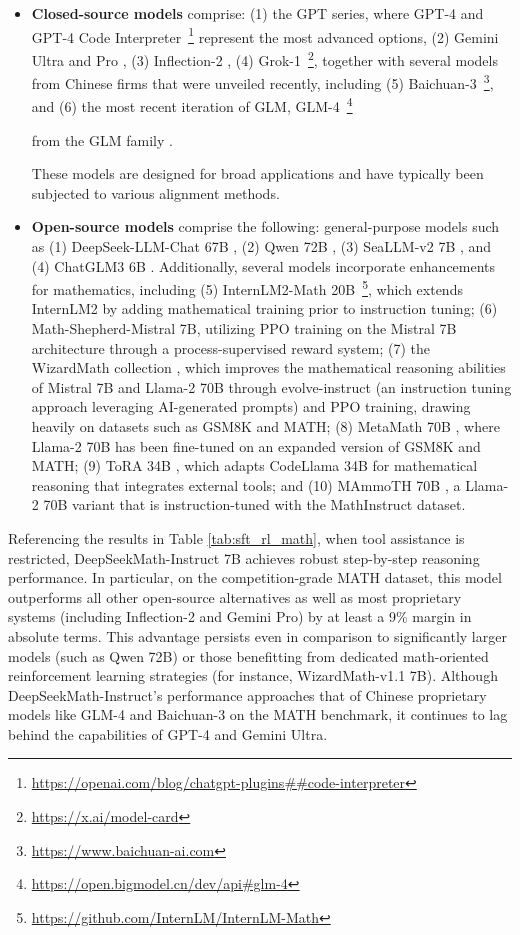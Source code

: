 \begin{itemize}[topsep=0pt]
\begin{itemize}[topsep=0pt]
    \item \textbf{Closed-source models} comprise: (1) the GPT series, where GPT-4 \citep{gpt4} and GPT-4 Code Interpreter~\footnote{\url{https://openai.com/blog/chatgpt-plugins\#\#code-interpreter}} represent the most advanced options, (2) Gemini Ultra and Pro \citep{gemini}, (3) Inflection-2 \citep{inflection-2}, (4) Grok-1~\footnote{\url{https://x.ai/model-card}}, together with several models from Chinese firms that were unveiled recently, including (5) Baichuan-3~\footnote{\url{https://www.baichuan-ai.com}}, and (6) the most recent iteration of GLM, GLM-4~\footnote{\url{https://open.bigmodel.cn/dev/api\#glm-4}}

    from the GLM family \citep{glm}.

These models are designed for broad applications and have typically been subjected to various alignment methods.  
\item \textbf{Open-source models} comprise the following: general-purpose models such as (1) DeepSeek-LLM-Chat 67B \citep{deepseek-llm}, (2) Qwen 72B \citep{qwen}, (3) SeaLLM-v2 7B \citep{seallm}, and (4) ChatGLM3 6B \citep{chatglm3}. Additionally, several models incorporate enhancements for mathematics, including (5) InternLM2-Math 20B~\footnote{\url{https://github.com/InternLM/InternLM-Math}}, which extends InternLM2 by adding mathematical training prior to instruction tuning; (6) Math-Shepherd-Mistral 7B, utilizing PPO training \citep{schulman2017proximal} on the Mistral 7B architecture \citep{mistral} through a process-supervised reward system; (7) the WizardMath collection \citep{wizardmath}, which improves the mathematical reasoning abilities of Mistral 7B and Llama-2 70B \citep{llama2} through evolve-instruct (an instruction tuning approach leveraging AI-generated prompts) and PPO training, drawing heavily on datasets such as GSM8K and MATH; (8) MetaMath 70B \citep{metamath}, where Llama-2 70B has been fine-tuned on an expanded version of GSM8K and MATH; (9) ToRA 34B \cite{tora}, which adapts CodeLlama 34B for mathematical reasoning that integrates external tools; and (10) MAmmoTH 70B \citep{MathInstruct}, a Llama-2 70B variant that is instruction-tuned with the MathInstruct dataset.  
\end{itemize}

Referencing the results in Table \ref{tab:sft_rl_math}, when tool assistance is restricted, DeepSeekMath-Instruct 7B achieves robust step-by-step reasoning performance. In particular, on the competition-grade MATH dataset, this model outperforms all other open-source alternatives as well as most proprietary systems (including Inflection-2 and Gemini Pro) by at least a 9\% margin in absolute terms. This advantage persists even in comparison to significantly larger models (such as Qwen 72B) or those benefitting from dedicated math-oriented reinforcement learning strategies (for instance, WizardMath-v1.1 7B). Although DeepSeekMath-Instruct's performance approaches that of Chinese proprietary models like GLM-4 and Baichuan-3 on the MATH benchmark, it continues to lag behind the capabilities of GPT-4 and Gemini Ultra.


\end{itemize}
